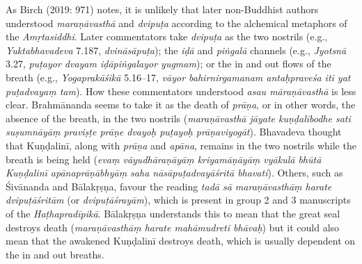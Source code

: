 \begin{ekdosis}
\begin{philcomm}[hp03_012]
As Birch (2019: 971) notes, it is unlikely that later non-Buddhist authors understood \textit{maraṇāvasthā} and \emph{dvipuṭa} according to the alchemical metaphors of the \textit{Amṛtasiddhi}. Later commentators take \emph{dvipuṭa} as the two nostrils (e.g., \textit{Yuktabhavadeva} 7.187, \textit{dvināsāpuṭa}); the \textit{iḍā} and \textit{piṅgalā} channels (e.g., \textit{Jyotsnā} 3.27, \textit{puṭayor dvayam iḍāpiṅgalayor yugmam}); or the in and out flows of the breath (e.g., \textit{Yogaprakāśikā} 5.16–17, \textit{vāyor bahirnirgamanam antaḥpraveśa iti yat puṭadvayaṃ tam}). How these commentators understood \textit{asau māraṇāvasthā} is less clear. Brahmānanda seems to take it as the death of \textit{prāṇa}, or in other words, the absence of the breath, in the two nostrils (\textit{maraṇāvasthā jāyate kuṇḍalībodhe sati suṣumnāyāṃ praviṣṭe prāṇe dvayoḥ puṭayoḥ prāṇaviyogāt}).  Bhavadeva thought that Kuṇḍalinī, along with \textit{prāṇa} and \textit{apāna}, remains in the two nostrils while the breath is being held (\textit{evaṃ vāyudhāraṇāyāṃ kriyamāṇāyāṃ vyākulā bhūtā Kuṇḍalinī apānaprāṇābhyāṃ saha nāsāpuṭadvayāśritā bhavati}). Others, such as Śivānanda and Bālakṛṣṇa, favour the reading \textit{tadā sā maraṇāvasthāṃ harate dvi\-puṭāśritām} (or \textit{dvipuṭāśrayām}), which is present in group 2 and 3 manuscripts of the \textit{Haṭhapradīpikā}. Bālakṛṣṇa understands this to mean that the great seal destroys death (\textit{maraṇāvasthāṃ harate mahāmudreti bhāvaḥ}) but it could also mean that the awakened Kuṇḍalinī destroys death, which is usually dependent on the in and out breaths.



\end{philcomm}
\end{ekdosis}
